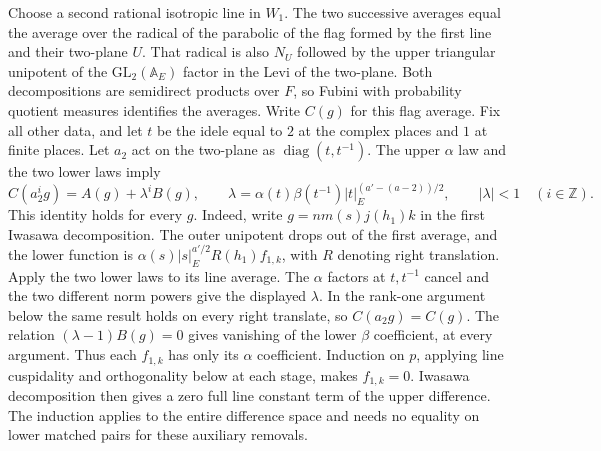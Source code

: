 Choose a second rational isotropic line in \(W_1\). The two successive
averages equal the average over the radical of the parabolic of the flag
formed by the first line and their two-plane \(U\). That radical is
also \(N_U\) followed by the upper triangular unipotent of the
\(\mathrm{GL}_2(\mathbb A_E)\) factor in the Levi of the two-plane.
Both decompositions are semidirect products over \(F\), so Fubini
with probability quotient measures identifies the averages. Write
\(C(g)\) for this flag average. Fix all other data, and let \(t\)
be the idele equal to \(2\) at the complex places and \(1\) at finite
places. Let \(a_2\) act on the two-plane as \(\operatorname{diag}(t,t^{-1})\).
The upper \(\alpha\) law and the two lower laws imply
\[
 C(a_2^i g)=A(g)+\lambda^i B(g),\qquad
 \lambda=\alpha(t)\beta(t^{-1})|t|_E^{(a'-(a-2))/2},\qquad
 |\lambda|<1\quad(i\in\mathbb Z).
\]
This identity holds for every \(g\). Indeed, write
\(g=n m(s)j(h_1)k\) in the first Iwasawa decomposition. The outer
unipotent drops out of the first average, and the lower function is
\(\alpha(s)|s|_E^{a'/2}R(h_1)f_{1,k}\), with \(R\) denoting right
translation. Apply the two lower laws to its line average. The
\(\alpha\) factors at \(t,t^{-1}\) cancel and the two different
norm powers give the displayed \(\lambda\). In the rank-one argument
below the same result holds on every right translate, so
\(C(a_2g)=C(g)\). The relation \((\lambda-1)B(g)=0\) gives vanishing
of the lower \(\beta\) coefficient, at every argument. Thus each
\(f_{1,k}\) has only its \(\alpha\) coefficient. Induction on \(p\),
applying line cuspidality and orthogonality below at each stage,
makes \(f_{1,k}=0\). Iwasawa decomposition then gives a zero full
line constant term of the upper difference. The induction applies to
the entire difference space and needs no equality on lower matched
pairs for these auxiliary removals.

